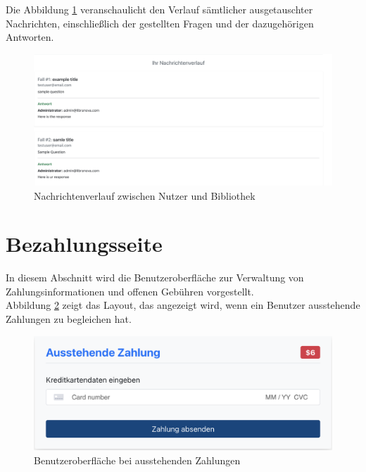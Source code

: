 \noindent Die Abbildung \ref{fig:Messages-History} veranschaulicht den Verlauf sämtlicher ausgetauschter Nachrichten, einschließlich der gestellten Fragen und der dazugehörigen Antworten.

\begin{figure}[H]
	\centering
	\includegraphics[width=1.0\textwidth]{images/UI-screenshots/Messages-History.png}
	\caption{Nachrichtenverlauf zwischen Nutzer und Bibliothek}
	\label{fig:Messages-History}
\end{figure}

\section{Bezahlungsseite}

In diesem Abschnitt wird die Benutzeroberfläche zur Verwaltung von Zahlungsinformationen und offenen Gebühren vorgestellt. \\

\noindent Abbildung \ref{fig:Outstanding-payment} zeigt das Layout, das angezeigt wird, wenn ein Benutzer ausstehende Zahlungen zu begleichen hat. 

\begin{figure}[H]
	\centering
	\includegraphics[width=1.0\textwidth]{images/UI-screenshots/Outstanding-payment.png}
	\caption{Benutzeroberfläche bei ausstehenden Zahlungen}
	\label{fig:Outstanding-payment}
\end{figure}


